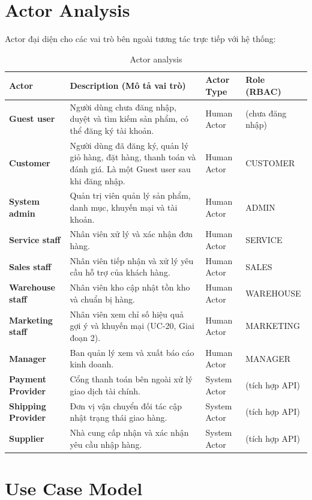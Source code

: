 \documentclass[12pt,a4paper,oneside]{report}
\begin{document}
\section{Actor Analysis}

Actor đại diện cho các vai trò bên ngoài tương tác trực tiếp với hệ thống:

\begin{longtable}{p{3.4cm}p{6.8cm}p{2.4cm}p{3.2cm}}
\caption{Actor analysis}\\
\toprule
\textbf{Actor} & \textbf{Description (Mô tả vai trò)} & \textbf{Actor Type} & \textbf{Role (RBAC)} \\
\midrule
\endhead
\bottomrule
\endlastfoot
\textbf{Guest user} & Người dùng chưa đăng nhập, duyệt và tìm kiếm sản phẩm, có thể đăng ký tài khoản. & Human Actor & (chưa đăng nhập) \\
\textbf{Customer} & Người dùng đã đăng ký, quản lý giỏ hàng, đặt hàng, thanh toán và đánh giá. Là một Guest user sau khi đăng nhập. & Human Actor & CUSTOMER \\
\textbf{System admin} & Quản trị viên quản lý sản phẩm, danh mục, khuyến mại và tài khoản. & Human Actor & ADMIN \\
\textbf{Service staff} & Nhân viên xử lý và xác nhận đơn hàng. & Human Actor & SERVICE \\
\textbf{Sales staff} & Nhân viên tiếp nhận và xử lý yêu cầu hỗ trợ của khách hàng. & Human Actor & SALES \\
\textbf{Warehouse staff} & Nhân viên kho cập nhật tồn kho và chuẩn bị hàng. & Human Actor & WAREHOUSE \\
\textbf{Marketing staff} & Nhân viên xem chỉ số hiệu quả gợi ý và khuyến mại (UC-20, Giai đoạn 2). & Human Actor & MARKETING \\
\textbf{Manager} & Ban quản lý xem và xuất báo cáo kinh doanh. & Human Actor & MANAGER \\
\textbf{Payment Provider} & Cổng thanh toán bên ngoài xử lý giao dịch tài chính. & System Actor & (tích hợp API) \\
\textbf{Shipping Provider} & Đơn vị vận chuyển đối tác cập nhật trạng thái giao hàng. & System Actor & (tích hợp API) \\
\textbf{Supplier} & Nhà cung cấp nhận và xác nhận yêu cầu nhập hàng. & System Actor & (tích hợp API) \\
\end{longtable}

\section{Use Case Model}
\end{document}
